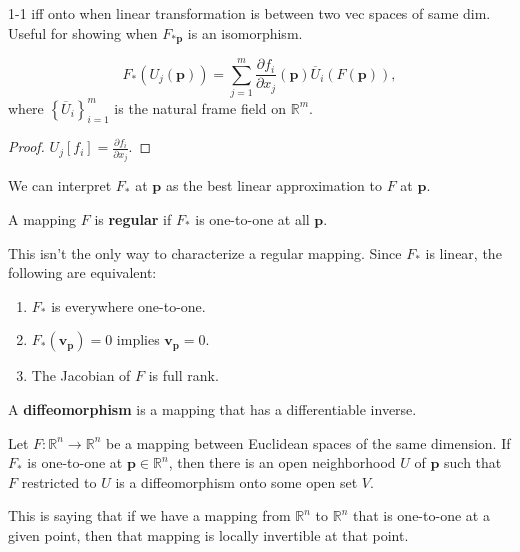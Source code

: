 \documentclass[10pt]{report}
\begin{document}
{\color{red}1-1 iff onto when linear transformation is between two vec spaces of same dim. Useful for showing when $F_{*\mathbf{p}}$ is an isomorphism.}

\begin{cor}
\[
	F_{*}(U_j(\mathbf{p})) = \sum_{j=1}^{m} \frac{\partial f_i}{\partial x_j} (\mathbf{p}) \overline{U}_{i}(F(\mathbf{p})),
\] where $\left\{ \overline{U}_i \right\}_{i=1}^m$ is the natural frame field on $\mathbb{R}^m$.
\end{cor}
\begin{proof}
	$U_j[f_i] = \frac{\partial f_i}{\partial x_j} .$
\end{proof}

\begin{note}
We can interpret $F_*$ at $\mathbf{p}$ as the best linear approximation to $F$ at $\mathbf{p}$.
\end{note}

\begin{defn}[]
A mapping $F$ is \textbf{regular} if $F_*$ is one-to-one at all $\mathbf{p}$.
\end{defn}

This isn't the only way to characterize a regular mapping. Since $F_*$ is linear, the following are equivalent:
\begin{enumerate}
	\item $F_*$ is everywhere one-to-one.
	\item $F_*(\mathbf{v}_{\mathbf{p}}) = 0$ implies $\mathbf{v}_{\mathbf{p}}=0.$ 
	\item The Jacobian of $F$ is full rank.
\end{enumerate}

\begin{defn}[]
	A \textbf{diffeomorphism} is a mapping that has a differentiable inverse.
\end{defn}

\begin{thrm}
Let $F:\mathbb{R}^n\to \mathbb{R}^n$ be a mapping between Euclidean spaces of the same dimension. If $F_*$ is one-to-one at $\mathbf{p}\in \mathbb{R}^n$, then there is an open neighborhood $U$ of $\mathbf{p}$ such that $F$ restricted to $U$ is a diffeomorphism onto some open set $V$.
\end{thrm}

This is saying that if we have a mapping from $\mathbb{R}^n$ to $\mathbb{R}^n$ that is one-to-one at a given point, then that mapping is locally invertible at that point.
\end{document}
